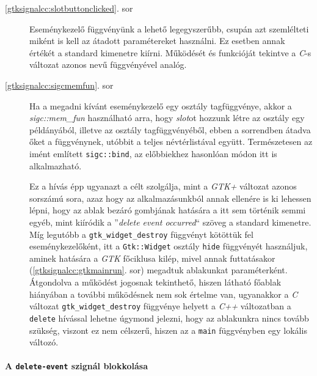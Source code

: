 \begin{description}
 \item[\ref{gtksignalcc:slotbuttonclicked}. sor] Eseménykezelő függvényünk a lehető legegyszerűbb, csupán azt szemlélteti miként is kell az átadott paramétereket használni. Ez esetben annak értékét a standard kimenetre kiírni. Működését és funkcióját tekintve a \textit{C}-s változat azonos nevű függvényével analóg.

 \item[\ref{gtksignalcc:sigcmemfun}. sor] Ha a megadni kívánt eseménykezelő egy osztály tagfüggvénye, akkor a \textit{sigc::mem\_fun} használható arra, hogy \textit{slot}ot hozzunk létre az osztály egy példányából, illetve az osztály tagfüggvényéből, ebben a sorrendben átadva őket a függvénynek, utóbbit a teljes névtérlistával együtt. Természetesen az imént említett \texttt{sigc::bind}, az előbbiekhez hasonlóan módon itt is alkalmazható. 

 Ez a hívás épp ugyanazt a célt szolgálja, mint a \textit{GTK+} változat azonos sorszámú sora, azaz hogy az alkalmazásunkból annak ellenére is ki lehessen lépni, hogy az ablak bezáró gombjának hatására a itt sem történik semmi egyéb, mint kiíródik a ''\textit{delete event occurred}`` szöveg a standard kimenetre. Míg legutóbb a \texttt{gtk\_widget\_destroy} függvényt kötöttük fel eseménykezelőként, itt a \texttt{Gtk::Widget} osztály \texttt{hide} függvényét használjuk, aminek hatására a \textit{GTK} főciklusa kilép, mivel annak futtatásakor (\ref{gtksignalcc:gtkmainrun}. sor) megadtuk ablakunkat paraméterként. Átgondolva a működést jogosnak tekinthető, hiszen látható főablak hiányában a további működésnek nem sok értelme van, ugyanakkor a \textit{C} változat \texttt{gtk\_widget\_destroy} függvénye helyett a \textit{C++} változatban a \texttt{delete} hívással lehetne úgymond jelezni, hogy az ablakunkra nincs tovább szükség, viszont ez nem célszerű, hiszen az a \texttt{main} függvényben egy lokális változó.
\end{description}

\paragraph{A \texttt{delete-event} szignál blokkolása}

